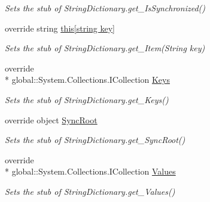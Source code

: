 \begin{DoxyCompactItemize}
\begin{DoxyCompactList}\small\item\em Sets the stub of String\-Dictionary.\-get\-\_\-\-Is\-Synchronized()\end{DoxyCompactList}\item 
override string \hyperlink{class_system_1_1_collections_1_1_specialized_1_1_fakes_1_1_stub_string_dictionary_a9978635e829847ba9e603c76ec68dc2d}{this\mbox{[}string key\mbox{]}}
\begin{DoxyCompactList}\small\item\em Sets the stub of String\-Dictionary.\-get\-\_\-\-Item(\-String key)\end{DoxyCompactList}\item 
override \\*
global\-::\-System.\-Collections.\-I\-Collection \hyperlink{class_system_1_1_collections_1_1_specialized_1_1_fakes_1_1_stub_string_dictionary_a206c4fadd55f9a6b51ad47b82a3344fd}{Keys}
\begin{DoxyCompactList}\small\item\em Sets the stub of String\-Dictionary.\-get\-\_\-\-Keys()\end{DoxyCompactList}\item 
override object \hyperlink{class_system_1_1_collections_1_1_specialized_1_1_fakes_1_1_stub_string_dictionary_a54ed3afb05b21be772cf56f065151990}{Sync\-Root}
\begin{DoxyCompactList}\small\item\em Sets the stub of String\-Dictionary.\-get\-\_\-\-Sync\-Root()\end{DoxyCompactList}\item 
override \\*
global\-::\-System.\-Collections.\-I\-Collection \hyperlink{class_system_1_1_collections_1_1_specialized_1_1_fakes_1_1_stub_string_dictionary_a08aecd11c380d92455e0cd33245cafc1}{Values}
\begin{DoxyCompactList}\small\item\em Sets the stub of String\-Dictionary.\-get\-\_\-\-Values()\end{DoxyCompactList}\end{DoxyCompactItemize}


